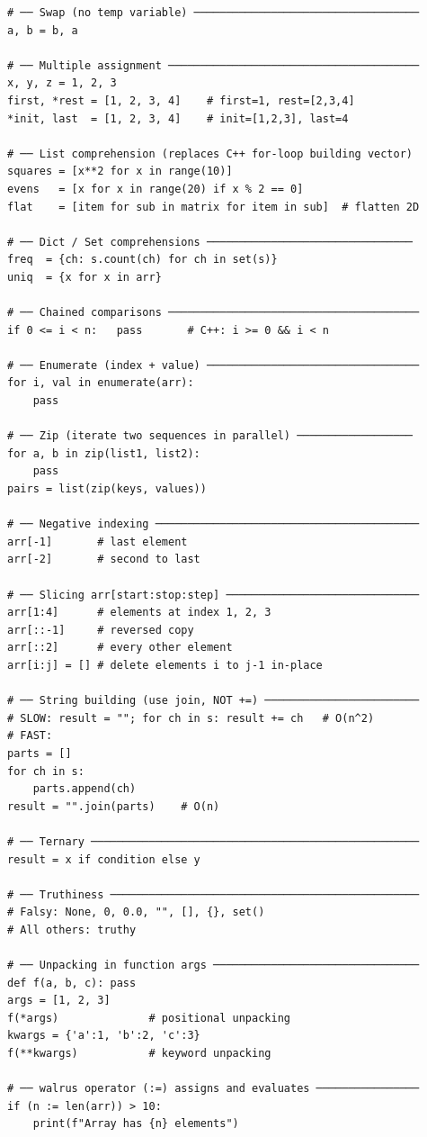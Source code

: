 \documentclass[11pt,a4paper]{report}
\begin{document}
\begin{lstlisting}
# ── Swap (no temp variable) ───────────────────────────────────
a, b = b, a

# ── Multiple assignment ───────────────────────────────────────
x, y, z = 1, 2, 3
first, *rest = [1, 2, 3, 4]    # first=1, rest=[2,3,4]
*init, last  = [1, 2, 3, 4]    # init=[1,2,3], last=4

# ── List comprehension (replaces C++ for-loop building vector) 
squares = [x**2 for x in range(10)]
evens   = [x for x in range(20) if x % 2 == 0]
flat    = [item for sub in matrix for item in sub]  # flatten 2D

# ── Dict / Set comprehensions ────────────────────────────────
freq  = {ch: s.count(ch) for ch in set(s)}
uniq  = {x for x in arr}

# ── Chained comparisons ───────────────────────────────────────
if 0 <= i < n:   pass       # C++: i >= 0 && i < n

# ── Enumerate (index + value) ─────────────────────────────────
for i, val in enumerate(arr):
    pass

# ── Zip (iterate two sequences in parallel) ──────────────────
for a, b in zip(list1, list2):
    pass
pairs = list(zip(keys, values))

# ── Negative indexing ─────────────────────────────────────────
arr[-1]       # last element
arr[-2]       # second to last

# ── Slicing arr[start:stop:step] ──────────────────────────────
arr[1:4]      # elements at index 1, 2, 3
arr[::-1]     # reversed copy
arr[::2]      # every other element
arr[i:j] = [] # delete elements i to j-1 in-place

# ── String building (use join, NOT +=) ────────────────────────
# SLOW: result = ""; for ch in s: result += ch   # O(n^2)
# FAST:
parts = []
for ch in s:
    parts.append(ch)
result = "".join(parts)    # O(n)

# ── Ternary ───────────────────────────────────────────────────
result = x if condition else y

# ── Truthiness ────────────────────────────────────────────────
# Falsy: None, 0, 0.0, "", [], {}, set()
# All others: truthy

# ── Unpacking in function args ────────────────────────────────
def f(a, b, c): pass
args = [1, 2, 3]
f(*args)              # positional unpacking
kwargs = {'a':1, 'b':2, 'c':3}
f(**kwargs)           # keyword unpacking

# ── walrus operator (:=) assigns and evaluates ────────────────
if (n := len(arr)) > 10:
    print(f"Array has {n} elements")
\end{lstlisting}
\end{document}
